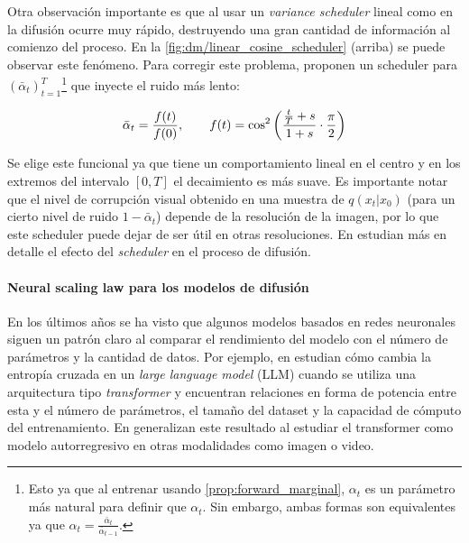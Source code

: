 Otra observación importante es que al usar un \textit{variance scheduler} lineal como en \cite{ho2020denoising} la difusión ocurre muy rápido, destruyendo una gran cantidad de información al comienzo del proceso. En la \autoref{fig:dm/linear_cosine_scheduler} (arriba) se puede observar este fenómeno. Para corregir este problema, proponen un scheduler para $(\bar\alpha_t)_{t=1}^T$\footnote{Esto ya que al entrenar usando \eqref{prop:forward_marginal}, $\alpha_t$ es un parámetro más natural para definir que $\alpha_t$. Sin embargo, ambas formas son equivalentes ya que $\alpha_t=\frac{\bar\alpha_t}{\bar\alpha_{t-1}}$.} que inyecte el ruido más lento:

\begin{equation*}
    \bar\alpha_t = \frac{f(t)}{f(0)},\qquad f(t)=\cos^2\left(\frac{\frac{t}{T}+s}{1+s}\cdot\frac{\pi}{2}\right)
\end{equation*}


Se elige este funcional ya que tiene un comportamiento lineal en el centro y en los extremos del intervalo $[0,T]$ el decaimiento es más suave. Es importante notar que el nivel de corrupción visual obtenido en una muestra de $q(x_t|x_0)$ (para un cierto nivel de ruido $1-\bar\alpha_t$) depende de la resolución de la imagen, por lo que este scheduler puede dejar de ser útil en otras resoluciones. En \cite{chen2023importancenoiseschedulingdiffusion} estudian más en detalle el efecto del \textit{scheduler} en el proceso de difusión.

\paragraph{Neural scaling law para los modelos de difusión}

En los últimos años se ha visto que algunos modelos basados en redes neuronales siguen un patrón claro al comparar el rendimiento del modelo con el número de parámetros y la cantidad de datos. Por ejemplo, en \cite{kaplan2020scaling} estudian cómo cambia la entropía cruzada en un \textit{large language model} (LLM) cuando se utiliza una arquitectura tipo \textit{transformer} y encuentran relaciones en forma de potencia entre esta y el número de parámetros, el tamaño del dataset y la capacidad de cómputo del entrenamiento. En \cite{farhani2022momentum} generalizan este resultado al estudiar el transformer como modelo autorregresivo en otras modalidades como imagen o video.

